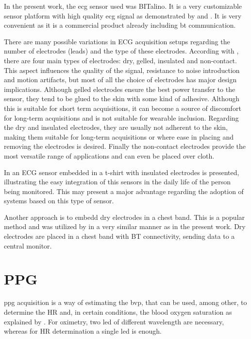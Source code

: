 In the present work, the \ac{ecg} sensor used was BITalino. It is a very customizable sensor platform with high quality \ac{ecg} signal as demonstrated by \citet{bitalinobatista2017experimental} and \citet{bitalinoguerreiro2013bitalino}. It is very convenient as it is a commercial product already including \ac{bt} communication.

There are many possible variations in ECG acquisition setups regarding the number of electrodes (leads) and the type of these electrodes. According with \citet{b_ecg_sensor}, there are four main types of electrodes: dry, gelled, insulated and non-contact. This aspect influences the quality of the signal, resistance to noise introduction and motion artifacts, but most of all the choice of electrodes has major design implications. Although gelled electrodes ensure the best power transfer to the sensor, they tend to be glued to the skin with some kind of adhesive. Although this is suitable for short term acquisitions, it can become a source of discomfort for long-term acquisitions and is not suitable for wearable inclusion. Regarding the dry and insulated electrodes, they are usually not adherent to the skin, making them suitable for long-term acquisitions or where ease in placing and removing the electrodes is desired. Finally the non-contact electrodes provide the most versatile range of applications and can even be placed over cloth.

In \citet{b_ecg_sensor2} an ECG sensor embedded in a t-shirt with insulated electrodes is presented, illustrating the easy integration of this sensors in the daily life of the person being monitored. This may present a major advantage regarding the adoption of systems based on this type of sensor.

Another approach is to embedd dry electrodes in a chest band. This is a popular method and was utilized by \citet{b_ecg_sensor3} in a very similar manner as in the present work. Dry electrodes are placed in a chest band with BT connectivity, sending data to a central monitor.



\FloatBarrier
\section{PPG}

\ac{ppg} acquisition is a way of estimating the \ac{bvp}, that can be used, among other, to determine the HR and, in certain conditions, the blood oxygen saturation as explained by \citet{b_ppg}. For oximetry, two \ac{led} of different wavelength are necessary, whereas for HR determination a single \ac{led} is enough.

